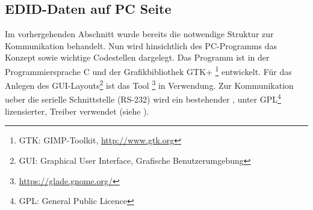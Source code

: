 \subsection{EDID-Daten auf PC Seite}
\label{edid_pc}
Im vorhergehenden Abschnitt wurde bereits die notwendige Struktur zur Kommunikation behandelt. Nun wird hinsichtlich des PC-Programms das Konzept sowie wichtige Codestellen dargelegt. Das Programm ist in der Programmiersprache C und der Grafikbibliothek GTK+ \footnote{GTK: GIMP-Toolkit, \url{http://www.gtk.org}} entwickelt. Für das Anlegen des GUI-Layouts\footnote{GUI: Graphical User Interface, Grafische Benutzerumgebung} ist das Tool \footnote{\url{https://glade.gnome.org/}} in Verwendung. Zur Kommunikation ueber die serielle Schnittstelle (RS-232) wird ein bestehender  , unter GPL\footnote{GPL: General Public Licence} lizensierter, Treiber verwendet (siehe \cite{rs232_lib}).

